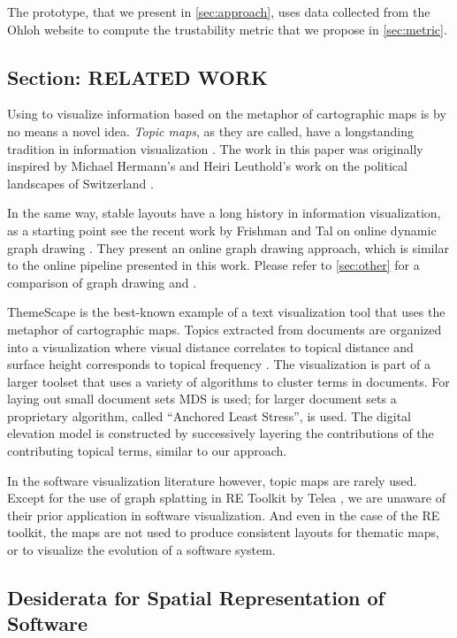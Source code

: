 The \Jbd prototype, that we present in \autoref{sec:approach}, uses data collected from the Ohloh website to compute the trustability metric that we propose in \autoref{sec:metric}.

\subsection{Section: RELATED WORK}
\label{sec:related}

Using \mds to visualize information based on the metaphor of cartographic maps is by no means a novel idea. \emph{Topic maps}, as they are called, have a longstanding tradition in information visualization \cite{Ware04a}. The work in this paper was originally inspired by Michael Hermann's and Heiri Leuthold's work on the political landscapes of Switzerland \cite{Herm03a}. 

In the same way, stable layouts have a long history in information visualization, as a starting point see \eg the recent work by Frishman and Tal on online dynamic graph drawing \cite{Fris08a}. They present an online graph drawing approach, which is similar to the online pipeline presented in this work. Please refer to \autoref{sec:other} for a comparison of graph drawing and \MDS. 

ThemeScape is the best-known example of a text visualization tool that uses the metaphor of cartographic maps. 
Topics extracted from documents are organized into a visualization where visual distance correlates to topical distance and surface height corresponds to topical frequency \cite{Wise95b}. The visualization is part of a larger toolset that uses a variety of algorithms to cluster terms in documents. For laying out small document sets MDS is used; for larger document sets a proprietary algorithm, called ``Anchored Least Stress'', is used. The digital elevation model is constructed by successively layering the contributions of the contributing topical terms, similar to our approach.

In the software visualization literature however, topic maps are rarely used.
Except for the use of graph splatting in RE Toolkit by Telea \etal \cite{Tele03a}, we are unaware of their prior application in software visualization. And even in the case of the RE toolkit, the maps are not used to produce consistent layouts for thematic maps, or to visualize the evolution of a software system. 


\subsection{Desiderata for Spatial Representation of Software}

